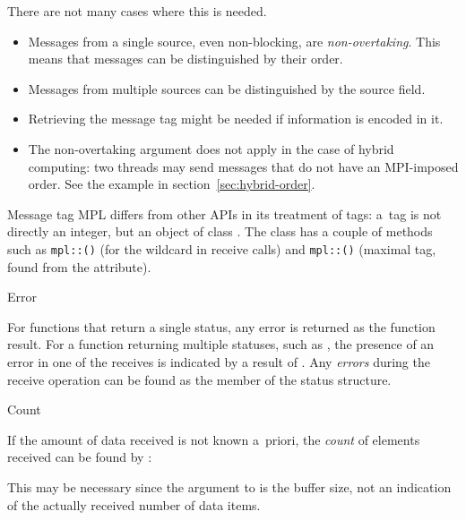 There are not many cases where this is needed.
\begin{itemize}
\item Messages from a single source, even non-blocking,
  are \emph{non-overtaking}.
  This means that messages can be distinguished by their order.
\item Messages from multiple sources can be distinguished by the source field.
\item Retrieving the message tag might be needed if information is encoded in it.
\item The non-overtaking argument does not apply in the case of hybrid
  computing: two threads may send messages that do not have an MPI-imposed order.
  See the example in section~\ref{sec:hybrid-order}.
\end{itemize}

\begin{mplnote}{Message tag}
  \ac{MPL} differs from other \acp{API} in its treatment of tags:
  a~tag is not directly an integer, but an object of class .
  The  class has a couple of methods such as
  \lstinline+mpl::+\lstinline+()+
  (for the  wildcard in receive calls)
  and
  \lstinline+mpl::+\lstinline+()+
  (maximal tag, found from the  attribute).
\end{mplnote}

 {Error}
\label{sec:mpi-status-error}

For functions that return a single status, any error is returned
as the function result.
For a function returning multiple statuses,
such as ,
the presence of an error in one of the receives
is indicated by a result of .
Any \emph{errors}
during the receive operation can be found as the
member of the status structure.


 {Count}
\label{sec:mpi-status-count}

If the amount of data received is not known a~priori, the
\emph{count} of elements received
can be found by 
:
%
%

This may be necessary since the  argument to  is 
the buffer size, not an indication of the actually received number of
data items.

